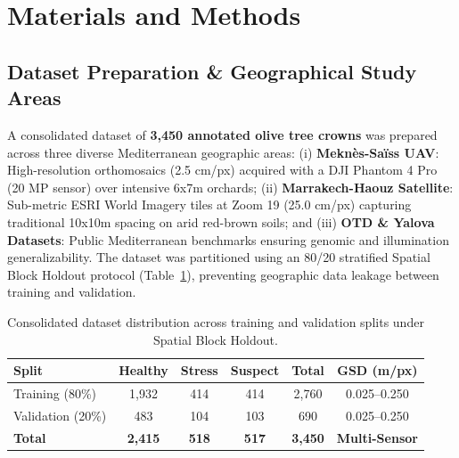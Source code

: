 \documentclass[5p,times]{elsarticle}
\begin{document}
\section{Materials and Methods}
\subsection{Dataset Preparation \& Geographical Study Areas}
A consolidated dataset of \textbf{3,450 annotated olive tree crowns} was prepared across three diverse Mediterranean geographic areas:
(i) \textbf{Mekn\`es-Sa\"iss UAV}: High-resolution orthomosaics (2.5 cm/px) acquired with a DJI Phantom 4 Pro (20 MP sensor) over intensive 6x7m orchards;
(ii) \textbf{Marrakech-Haouz Satellite}: Sub-metric ESRI World Imagery tiles at Zoom 19 (25.0 cm/px) capturing traditional 10x10m spacing on arid red-brown soils; and
(iii) \textbf{OTD \& Yalova Datasets}: Public Mediterranean benchmarks \cite{atik2026benchmarking} ensuring genomic and illumination generalizability.
The dataset was partitioned using an 80/20 stratified Spatial Block Holdout protocol (Table~\ref{tab:dataset}), preventing geographic data leakage between training and validation.

\begin{table}[htbp]
\centering
\caption{Consolidated dataset distribution across training and validation splits under Spatial Block Holdout.}
\label{tab:dataset}
\small
\begin{tabular}{lccccc}
\toprule
\textbf{Split} & \textbf{Healthy} & \textbf{Stress} & \textbf{Suspect} & \textbf{Total} & \textbf{GSD (m/px)} \\
\midrule
Training (80\%) & 1,932 & 414 & 414 & 2,760 & 0.025--0.250 \\
Validation (20\%) & 483 & 104 & 103 & 690 & 0.025--0.250 \\
\midrule
\textbf{Total} & \textbf{2,415} & \textbf{518} & \textbf{517} & \textbf{3,450} & \textbf{Multi-Sensor} \\
\bottomrule
\end{tabular}
\end{table}
\end{document}
